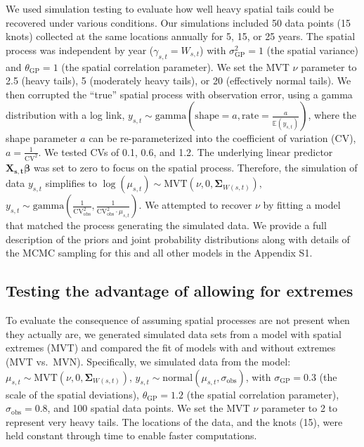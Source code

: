 \documentclass[12pt,english]{article}
\begin{document}
\begin{spacing}{1.8}
We used simulation testing to evaluate how well heavy spatial tails could be
recovered under various conditions. Our simulations included 50 data points (15
knots) collected at the same locations annually for 5, 15, or 25 years. The spatial
process was independent by year ($\gamma_{s,t} = W_{s,t}$) with $\sigma_{\mathrm{GP}}^2 = 1$
(the spatial variance) and $\theta_{\mathrm{GP}} = 1$ (the spatial correlation parameter).
We set the MVT $\nu$ parameter to 2.5 (heavy tails), 5 (moderately heavy tails),
or 20 (effectively normal tails). We then corrupted the ``true'' spatial process
with observation error, using a gamma distribution with a log link,
$y_{s,t}\sim
\mathrm{gamma}\left(\mathrm{shape} = a,
  \mathrm{rate} = \frac {a}{\mathbb{E}(y_{s,t})} \right)$, where the shape
parameter $a$ can be re-parameterized into the coefficient of variation (CV),
$a=\frac{1}{\mathrm{CV}^2}$. We tested CVs of 0.1, 0.6, and 1.2. The underlying
linear predictor $\mathbf{X_{s,t}} \bm{\beta}$ was set to zero to focus on the
spatial process. Therefore, the simulation of data $y_{s,t}$ simplifies to
$\log(\mu_{s,t}) \sim \mathrm{MVT}\left(\nu, 0, \mathbf{\Sigma}_{W(s,t)}\right),$\\
\noindent
$y_{s,t} \sim \mathrm{gamma} \left( \frac{1}{\mathrm{CV}_\mathrm{obs}^2},
    \frac{1}{\mathrm{CV}_\mathrm{obs}^2 \cdot \mu_{s,t} } \right)$.
We attempted to recover $\nu$ by fitting a model that matched the process
generating the simulated data. We provide a full description of the priors
and joint probability distributions along with details of the MCMC
sampling for this and all other models in the Appendix S1.

\subsection{Testing the advantage of allowing for extremes}
\label{sec:diagnosing}

To evaluate the consequence of assuming spatial processes are not present when
they actually are, we generated simulated data sets from a model with spatial
extremes (MVT) and compared the fit of models with and without extremes (MVT
vs.\ MVN). Specifically, we simulated data from the model:
$\mu_{s,t} \sim \mathrm{MVT}\left(\nu, 0, \mathbf{\Sigma}_{W(s,t)}\right)$,
$y_{s,t} \sim \mathrm{normal} \left(\mu_{s,t},
  \sigma_{\mathrm{obs}} \right)$,
with $\sigma_{\mathrm{GP}} = 0.3$ (the scale of the spatial deviations),
$\theta_{\mathrm{GP}} = 1.2$ (the spatial correlation parameter),
$\sigma_{\mathrm{obs}} = 0.8$, and 100 spatial data points.
We set the MVT $\nu$ parameter to 2 to represent very heavy tails.
The locations of the data, and the knots (15), were held constant through time
to enable faster computations.


\end{spacing}
\end{document}
